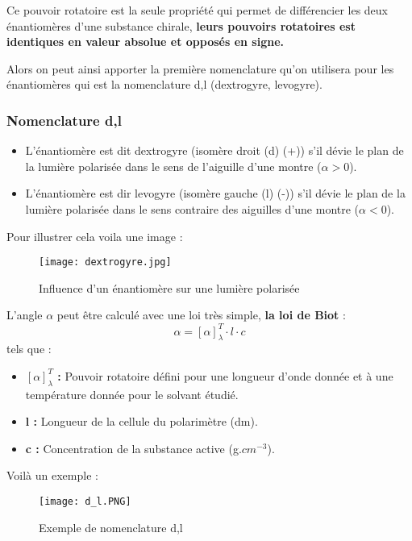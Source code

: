 \documentclass[a4paper, oneside]{book}
\begin{document}
Ce pouvoir rotatoire est la seule propriété qui permet de différencier les deux énantiomères d'une substance chirale, \textbf{leurs pouvoirs rotatoires est identiques en valeur absolue et opposés en signe.}

Alors on peut ainsi apporter la première nomenclature qu'on utilisera pour les énantiomères qui est la nomenclature d,l (dextrogyre, levogyre).
\subsubsection{Nomenclature d,l}
\begin{itemize}
    \item L'énantiomère est dit dextrogyre (isomère droit (d) (+)) s'il dévie le plan de la lumière polarisée dans le sens de l'aiguille d'une montre ($\alpha > 0$).
    \item L'énantiomère est dir levogyre (isomère gauche (l) (-)) s'il dévie le plan de la lumière polarisée dans le sens contraire des aiguilles d'une montre ($\alpha < 0$).
\end{itemize}
Pour illustrer cela voila une image :
\begin{figure}[!h]
    \centering
    \texttt{[image: dextrogyre.jpg]}
    \caption{Influence d'un énantiomère sur une lumière polarisée}
    \label{fig:my_label}
\end{figure}

L'angle $\alpha$ peut être calculé avec une loi très simple, \textbf{la loi de Biot} :
\[
    \alpha=[\alpha]_\lambda^T \cdot l \cdot c
\]
tels que :
\begin{itemize}
    \item \textbf{$[\alpha]_\lambda^T$ :} Pouvoir rotatoire défini pour une longueur d'onde donnée et à une température donnée pour le solvant étudié.
    \item \textbf{l : }Longueur de la cellule du polarimètre (dm).
    \item \textbf{c : }Concentration de la substance active (g.$cm^{-3}$).
\end{itemize}
Voilà un exemple :
\begin{figure}[!h]
    \centering
    \texttt{[image: d\_l.PNG]}
    \caption{Exemple de nomenclature d,l}
    \label{fig:my_label}
\end{figure}
\newpage
\end{document}

